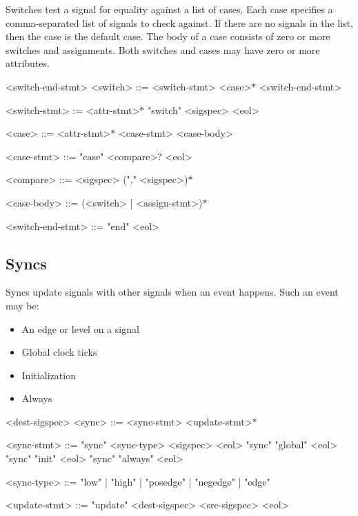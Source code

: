Switches test a signal for equality against a list of cases. Each case specifies a comma-separated list of signals to check against. If there are no signals in the list, then the case is the default case. The body of a case consists of zero or more switches and assignments. Both switches and cases may have zero or more attributes.

\begin{indentgrammar}{<switch-end-stmt>}
<switch> ::= <switch-stmt> <case>$*$ <switch-end-stmt>

<switch-stmt> := <attr-stmt>$*$ "switch" <sigspec> <eol>

<case> ::= <attr-stmt>$*$ <case-stmt> <case-body>

<case-stmt> ::= "case" <compare>$?$ <eol>

<compare> ::= <sigspec> ("," <sigspec>)$*$

<case-body> ::= (<switch> | <assign-stmt>)$*$

<switch-end-stmt> ::= "end" <eol>
\end{indentgrammar}

\subsection{Syncs}

Syncs update signals with other signals when an event happens. Such an event may be:

\begin{itemize}
  \item An edge or level on a signal
  \item Global clock ticks
  \item Initialization
  \item Always
\end{itemize}

\begin{indentgrammar}{<dest-sigspec>}
<sync> ::= <sync-stmt> <update-stmt>$*$

<sync-stmt> ::= 
"sync" <sync-type> <sigspec> <eol>
  \alt "sync" "global" <eol>
  \alt "sync" "init" <eol>
  \alt "sync" "always" <eol>

<sync-type> ::= "low" | "high" | "posedge" | "negedge" | "edge"

<update-stmt> ::= "update" <dest-sigspec> <src-sigspec> <eol>
\end{indentgrammar}
